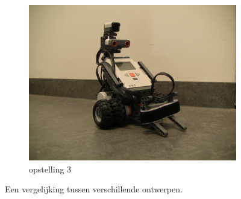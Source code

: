 \documentclass[tt2]{penoverslag}
\begin{document}
\begin{figure}
\begin{subfigure}[h]{0.33\textwidth}
		\includegraphics[width=\textwidth]{robotNieuw}
	\caption{opstelling 3}
	\end{subfigure}
\caption{Een vergelijking tussen verschillende ontwerpen.}
\label{fig:robotBouw}
\end{figure}
\end{document}
